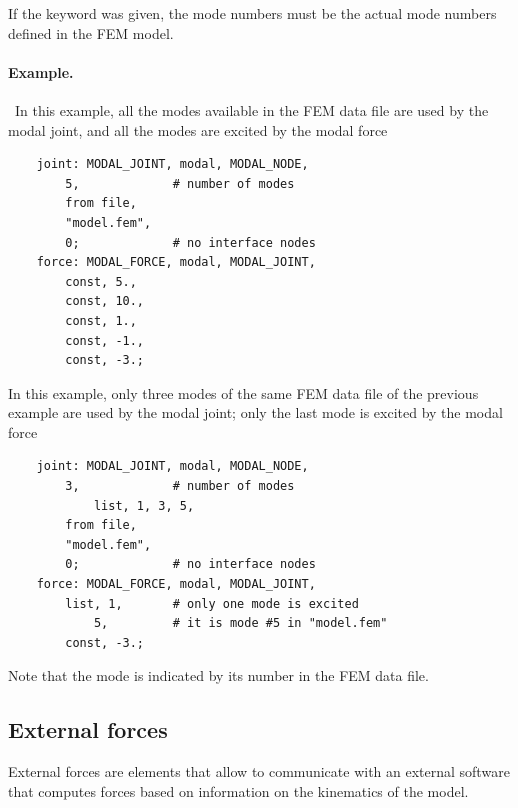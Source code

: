 If the keyword  was given, the mode numbers must be
the actual mode numbers defined in the FEM model.

\paragraph{Example.} \
In this example, all the modes available in the FEM data file 
are used by the modal joint, and all the modes are excited
by the modal force
\begin{verbatim}
    joint: MODAL_JOINT, modal, MODAL_NODE,
        5,             # number of modes
        from file,
        "model.fem",
        0;             # no interface nodes
    force: MODAL_FORCE, modal, MODAL_JOINT,
        const, 5.,
        const, 10.,
        const, 1.,
        const, -1.,
        const, -3.;
\end{verbatim}

In this example, only three modes of the same FEM data file
of the previous example are used by the modal joint;
only the last mode is excited by the modal force
\begin{verbatim}
    joint: MODAL_JOINT, modal, MODAL_NODE,
        3,             # number of modes
            list, 1, 3, 5,
        from file,
        "model.fem",
        0;             # no interface nodes
    force: MODAL_FORCE, modal, MODAL_JOINT,
        list, 1,       # only one mode is excited
            5,         # it is mode #5 in "model.fem"
        const, -3.;
\end{verbatim}
Note that the mode is indicated by its number in the FEM data file.




\subsection{External forces}
External forces are elements that allow to communicate
with an external software that computes forces
based on information on the kinematics of the model.

